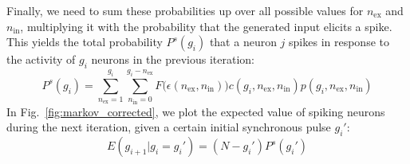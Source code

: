 \documentclass[10pt,a4paper,onecolumn]{article}
\begin{document}
Finally, we need to sum these probabilities up over all possible values for $n_\text{ex}$ and $n_\text{in}$, multiplying it with the probability that the generated input elicits a spike. This yields the total probability $P^s(g_i)$ that a neuron $j$ spikes in response to the activity of $g_i$ neurons in the previous iteration:
\begin{equation}
P^s(g_i) = \sum_{n_\text{ex}=1}^{g_i}\sum_{n_\text{in}=0}^{g_i-n_\text{ex}} F\big(\epsilon(n_\text{ex}, n_\text{in})\big) c(g_i, n_\text{ex}, n_\text{in}) p(g_i, n_\text{ex}, n_\text{in})
\end{equation}
In Fig.~\ref{fig:markov_corrected}, we plot the expected value of spiking neurons during the next iteration, given a certain initial synchronous pulse $g_i'$:
\begin{equation}
E(g_{i+1}|g_i = g_i') = (N - g_i') P^s(g_i')
\end{equation}
\end{document}
